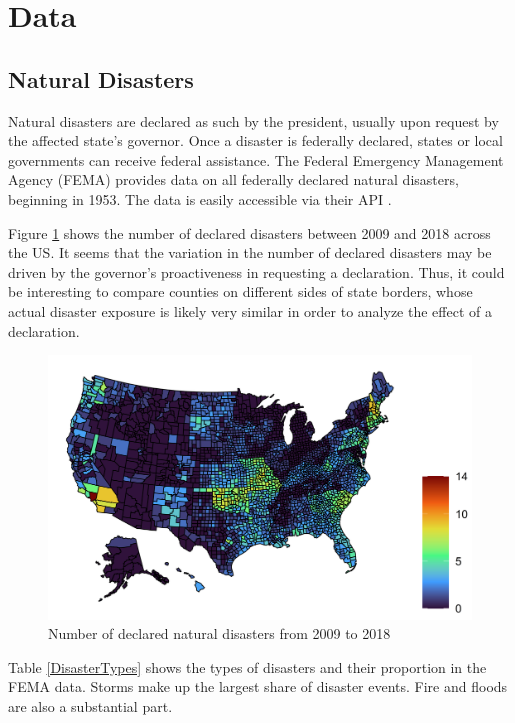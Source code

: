 
\section{Data} \label{Data}

\subsection{Natural Disasters}

Natural disasters are declared as such by the president, usually upon request by the affected state's governor. Once a disaster is federally declared, states or local governments can receive federal assistance. The Federal Emergency Management Agency (FEMA) provides data on all federally declared natural disasters, beginning in 1953. The data is easily accessible via their API \citep{rfema}.

Figure \ref{DisasterMap} shows the number of declared disasters between 2009 and 2018 across the US. It seems that the variation in the number of declared disasters may be driven by the governor's proactiveness in requesting a declaration. Thus, it could be interesting to compare counties on different sides of state borders, whose actual disaster exposure is likely very similar in order to analyze the effect of a declaration.


\begin{figure}[!h]
	\centering
	\includegraphics[scale=1]{"../Code & Data/DisasterMap.png"}
	\caption{Number of declared natural disasters from 2009 to 2018}
	\label{DisasterMap}
\end{figure}

Table \ref{DisasterTypes} shows the types of disasters and their proportion in the FEMA data. Storms make up the largest share of disaster events. Fire and floods are also a substantial part.

